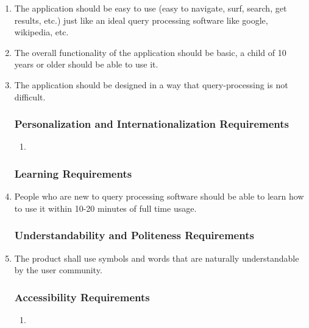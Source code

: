 \documentclass[]{article}
\begin{document}
\begin{enumerate}[{UH}1. ]
	\item The application should be easy to use (easy to navigate, surf, search, get results, etc.) just like an ideal query processing software like google, wikipedia, etc.
	\item The overall functionality of the application should be basic, a child of 10 years or older should be able to use it.
	\item The application should be designed in a way that query-processing is not difficult.

\subsubsection{Personalization and Internationalization Requirements}
\label{ssub:personalization_and_internationalization_requirements}
\begin{enumerate}[{N/A} ]
	\item
\end{enumerate}

\subsubsection{Learning Requirements}
\label{ssub:learning_requirements}
	\item People who are new to query processing software should be able to learn how to use it within 10-20 minutes of full time usage.
	

\subsubsection{Understandability and Politeness Requirements}
\label{ssub:understandability_and_politeness_requirements}
	\item The product shall use symbols and words that are naturally understandable by the user community.

\subsubsection{Accessibility Requirements}
\label{ssub:accessibility_requirements}
\begin{enumerate}[{N/A} ]
	\item
\end{enumerate}
\end{enumerate}
\end{document}
